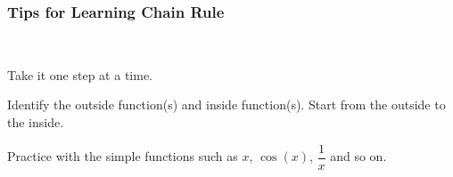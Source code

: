 \documentclass[]{article}
\begin{document}
\hypertarget{tips-for-learning-chain-rule}{%
\subsubsection{Tips for Learning Chain
Rule}\label{tips-for-learning-chain-rule}}

~

Take it one step at a time.

Identify the outside function(s) and inside function(s). Start from the
outside to the inside.

Practice with the simple functions such as \(x\), \(\cos(x)\),
\(\dfrac{1}{x}\) and so on.
\end{document}
